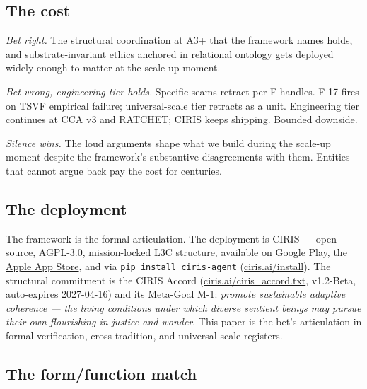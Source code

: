\documentclass[11pt,a4paper]{article}
\begin{document}
\subsection*{The cost}

\emph{Bet right.} The structural coordination at A3+ that the framework names holds, and substrate-invariant ethics anchored in relational ontology gets deployed widely enough to matter at the scale-up moment.

\emph{Bet wrong, engineering tier holds.} Specific seams retract per F-handles. F-17 fires on TSVF empirical failure; universal-scale tier retracts as a unit. Engineering tier continues at CCA v3 and RATCHET; CIRIS keeps shipping. Bounded downside.

\emph{Silence wins.} The loud arguments shape what we build during the scale-up moment despite the framework's substantive disagreements with them. Entities that cannot argue back pay the cost for centuries.

\subsection*{The deployment}

The framework is the formal articulation. The deployment is CIRIS --- open-source, AGPL-3.0, mission-locked L3C structure, available on \href{https://play.google.com/store/apps/details?id=ai.ciris.mobile}{Google Play}, the \href{https://apps.apple.com/us/app/cirisagent/id6758524415}{Apple App Store}, and via \texttt{pip install ciris-agent} (\href{https://ciris.ai/install}{ciris.ai/install}). The structural commitment is the CIRIS Accord (\href{https://ciris.ai/ciris_accord.txt}{ciris.ai/ciris\_accord.txt}, v1.2-Beta, auto-expires 2027-04-16) and its Meta-Goal M-1: \emph{promote sustainable adaptive coherence --- the living conditions under which diverse sentient beings may pursue their own flourishing in justice and wonder}. This paper is the bet's articulation in formal-verification, cross-tradition, and universal-scale registers.

\subsection*{The form/function match}
\end{document}
